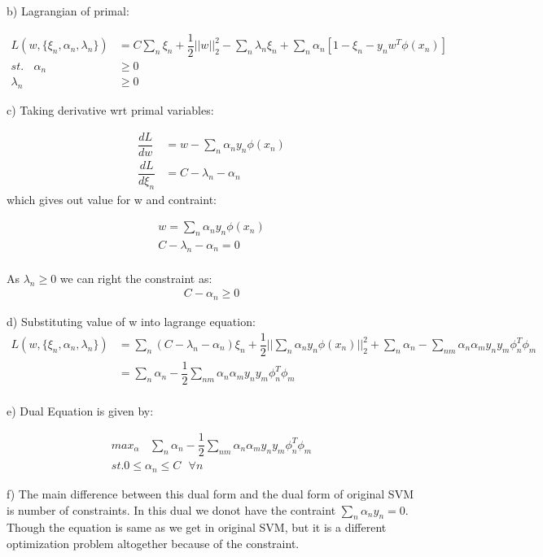 \documentclass[paper=a4, fontsize=11pt]{scrartcl} %
\numberwithin{equation}{section} %
\numberwithin{figure}{section} %
\numberwithin{table}{section} %
\begin{document}
b) Lagrangian of primal:

\begin{align*} 
L(w,\{\xi_{n},\alpha_{n},\lambda_{n}\}) &= C\sum_{n}\xi_{n} + \dfrac{1}{2}||w||^{2}_{2} - \sum_{n}\lambda_{n}\xi_{n} + \sum_{n}\alpha_{n}[1-\xi_{n}-y_{n}w^{T}\phi(x_{n})]\\
st. ~~~~ \alpha_{n} &\geqslant 0\\
\lambda_{n} &\geqslant 0
\end{align*}

c) Taking derivative wrt primal variables:

\begin{align*}
\dfrac{dL}{dw} &= w - \sum_{n}\alpha_{n}y_{n}\phi(x_{n})\\
\dfrac{dL}{d\xi_{n}} &= C - \lambda_{n} - \alpha_{n}
\end{align*}
which gives out value for w and contraint:


\begin{align*}
w = \sum_{n}\alpha_{n}y_{n}\phi(x_{n})\\
C - \lambda_{n} - \alpha_{n} = 0\\
\end{align*}

As $\lambda_{n} \geqslant 0$ we can right the constraint as:
\begin{align*}
C - \alpha_{n} \geqslant 0
\end{align*}

d) Substituting value of w into lagrange equation:
\begin{align*}
L(w,\{\xi_{n},\alpha_{n},\lambda_{n}\}) &= \sum_{n}(C-\lambda_{n} - \alpha_{n})\xi_{n} + \dfrac{1}{2}||\sum_{n}\alpha_{n}y_{n}\phi(x_{n})||_{2}^{2} + \sum_{n}\alpha_{n} - \sum_{nm}\alpha_{n}\alpha_{m}y_{n}y_{m}\phi_{n}^{T}\phi_{m}\\
&= \sum_{n}\alpha_{n} - \dfrac{1}{2}\sum_{nm}\alpha_{n}\alpha_{m}y_{n}y_{m}\phi_{n}^{T}\phi_{m}\\
\end{align*}

e) Dual Equation is given by:

\begin{align*}
max_{\alpha} ~~~~ \sum_{n}\alpha_{n} - \dfrac{1}{2}\sum_{nm}\alpha_{n}\alpha_{m}y_{n}y_{m}\phi_{n}^{T}\phi_{m}\\
st. 0 \leqslant \alpha_{n}\leqslant C ~~~\forall n
\end{align*}

f) The main difference between this dual form and the dual form of original SVM is number of constraints. In this dual we donot have the contraint $\sum_{n}\alpha_{n}y_{n}=0$. Though the equation is same as we get in original SVM, but it is a different optimization problem altogether because of the constraint. \\\\
\end{document}
